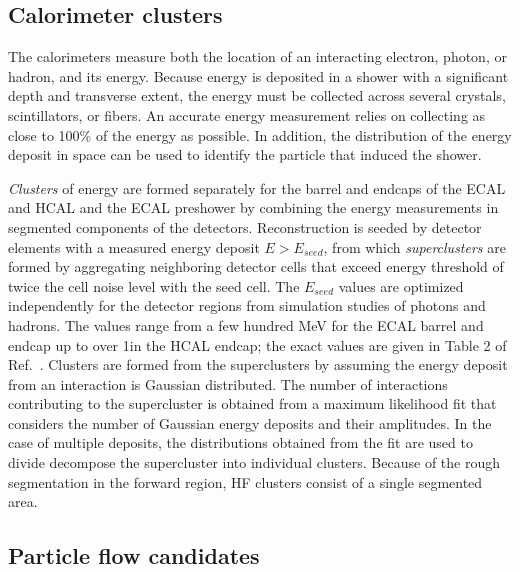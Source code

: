 \subsection{Calorimeter clusters}
The calorimeters measure both the location of an interacting
electron, photon, or hadron, and its energy. Because energy is deposited
in a shower with a significant depth and transverse extent, the energy
must be collected across several crystals, scintillators, or fibers.
An accurate energy measurement relies on collecting
as close to 100\% of the energy as possible. In addition, the distribution
of the energy deposit in space can be used to identify the particle
that induced the shower.

\emph{Clusters} of energy are formed separately for the 
barrel and endcaps of the ECAL and HCAL and the 
ECAL preshower by combining the energy measurements in segmented
components of the detectors. 
Reconstruction is seeded by detector elements with a measured energy deposit
$E>E_{seed}$, from which \emph{superclusters} are formed
by aggregating neighboring detector cells that exceed
energy threshold of twice the cell noise level with the seed cell. 
The $E_{seed}$ values are optimized 
independently for the detector regions 
from simulation studies of photons and hadrons.
The values range 
from a few hundred MeV for the ECAL barrel and endcap up to over 1\GeV in the HCAL
endcap; the exact values are given in Table 2 of Ref.~\cite{CMS-PRF-14-001}.
Clusters are formed from the superclusters by assuming the energy
deposit from an interaction is Gaussian distributed. The number of interactions
contributing to the supercluster is obtained from a maximum likelihood fit
that considers the number of Gaussian energy deposits and their amplitudes.
In the case of multiple deposits, the distributions obtained from the fit
are used to divide decompose the supercluster into individual clusters.
Because of the rough segmentation in the
forward region, HF clusters consist of a single segmented area.

\subsection{Particle flow candidates}
\label{sec:pfcandidates}

